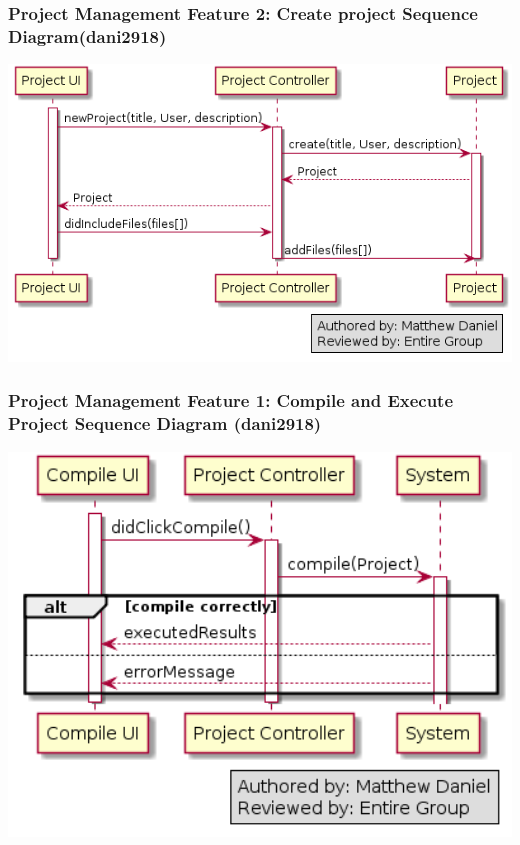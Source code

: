\documentclass[twoside,letterpaper]{article}
\begin{document}
	\subsubsection[Project Management Feature 2: Create project Sequence Diagram (dani2918)]{\rmfamily\bfseries\color{black}
		Project Management Feature 2: Create project Sequence Diagram(dani2918)}
	
	\bigskip
	
	\includegraphics[width=6.0in]{images/SequenceDiagrams/PMCreateProject.png}
	\label{pm:sd3}
	\newpage

	\subsubsection[Project Management Feature 1: Sequence Diagram 1: Compile and execute project (dani2918)]{\rmfamily\bfseries\color{black}
		Project Management Feature 1: Compile and Execute Project Sequence Diagram (dani2918) }
	
	\bigskip
	
	\includegraphics[width=6.0in]{images/SequenceDiagrams/PMCompile}
	\label{pm:sd1}
	
\end{document}
